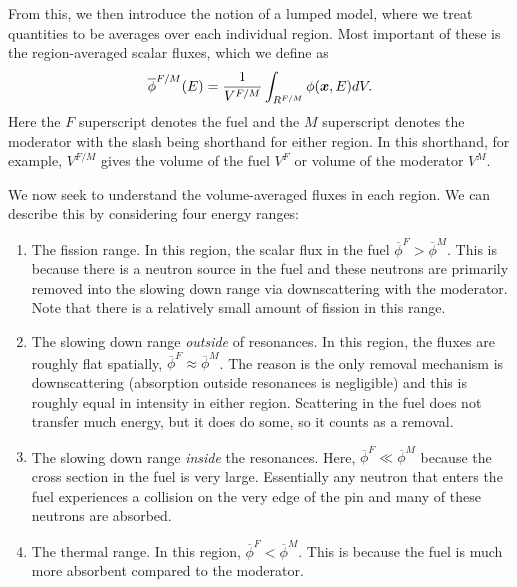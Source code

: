 From this, we then introduce the notion of a lumped model, where we treat quantities to be averages over each individual region. Most important of these is the region-averaged scalar fluxes, which we define as
\begin{align}
  \overline{\phi}^{F/M}(E) = \frac{1}{V^{F/M}} \int_{R^{F/M}} \phi(\bm{x},E) dV . \label{Eq:thermalization_volumeAveragedFlux}
\end{align}
Here the $F$ superscript denotes the fuel and the $M$ superscript denotes the moderator with the slash being shorthand for either region. In this shorthand, for example, $V^{F/M}$ gives the volume of the fuel $V^F$ or volume of the moderator $V^M$.

We now seek to understand the volume-averaged fluxes in each region. We can describe this by considering four energy ranges:
\begin{enumerate}
  \item The fission range. In this region, the scalar flux in the fuel $\overline{\phi}^F > \overline{\phi}^M$. This is because there is a neutron source in the fuel and these neutrons are primarily removed into the slowing down range via downscattering with the moderator. Note that there is a relatively small amount of fission in this range.
  \item The slowing down range \emph{outside} of resonances. In this region, the fluxes are roughly flat spatially, $\overline{\phi}^F \approx \overline{\phi}^M$. The reason is the only removal mechanism is downscattering (absorption outside resonances is negligible) and this is roughly equal in intensity in either region. Scattering in the fuel does not transfer much energy, but it does do some, so it counts as a removal.
  \item The slowing down range \emph{inside} the resonances. Here, $\overline{\phi}^F \ll \overline{\phi}^M$ because the cross section in the fuel is very large. Essentially any neutron that enters the fuel experiences a collision on the very edge of the pin and many of these neutrons are absorbed.
  \item The thermal range. In this region, $\overline{\phi}^F < \overline{\phi}^M$. This is because the fuel is much more absorbent compared to the moderator.
\end{enumerate}

